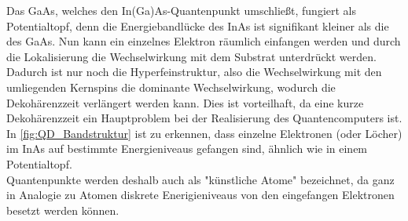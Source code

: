 \noindent Das GaAs, welches den In(Ga)As-Quantenpunkt umschließt, fungiert als Potentialtopf, denn die Energiebandlücke des InAs ist 
signifikant kleiner als die des GaAs. Nun kann ein einzelnes Elektron räumlich einfangen werden und durch die Lokalisierung 
die Wechselwirkung mit dem Substrat unterdrückt werden. Dadurch ist nur noch die Hyperfeinstruktur, also die Wechselwirkung mit den 
umliegenden Kernspins die dominante Wechselwirkung, wodurch die Dekohärenzzeit verlängert werden kann. Dies ist vorteilhaft, da 
eine kurze Dekohärenzzeit ein Hauptproblem bei der Realisierung des Quantencomputers ist.\\
In \autoref{fig:QD_Bandstruktur} ist zu erkennen, dass einzelne Elektronen (oder Löcher)
im InAs auf bestimmte Energieniveaus gefangen sind, ähnlich wie in einem Potentialtopf.\\
Quantenpunkte werden deshalb auch als "künstliche Atome" bezeichnet, da ganz in Analogie zu Atomen diskrete Enerigieniveaus 
von den eingefangen Elektronen besetzt werden können.
%